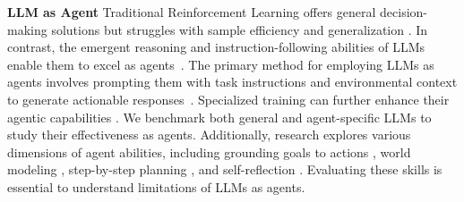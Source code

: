 \textbf{LLM as Agent}
Traditional Reinforcement Learning offers general decision-making solutions but struggles with sample efficiency and generalization \citep{pourchot2018cem}. In contrast, the emergent reasoning and instruction-following abilities of LLMs \citep{wei2022emergent} enable them to excel as agents~\citep{yao2022react, autogpt, wang2023voyager}. The primary method for employing LLMs as agents involves prompting them with task instructions and environmental context to generate actionable responses~\citep{autogpt, xie2023openagents}. Specialized training can further enhance their agentic capabilities \citep{xu2023lemur, reed2022generalist, driess2023palm}. We benchmark both general \citep{openai2023gpt, touvron2023llama, chiang2023vicuna} and agent-specific LLMs \citep{xu2023lemur} to study their effectiveness as agents. Additionally, research explores various dimensions of agent abilities, including grounding goals to actions \citep{gu2022don, ahn2022can}, world modeling \citep{lecun2022path}, step-by-step planning \citep{song2023llm}, and self-reflection \citep{madaan2023self, wang2023mint}. Evaluating these skills is essential to understand limitations of LLMs as agents.


